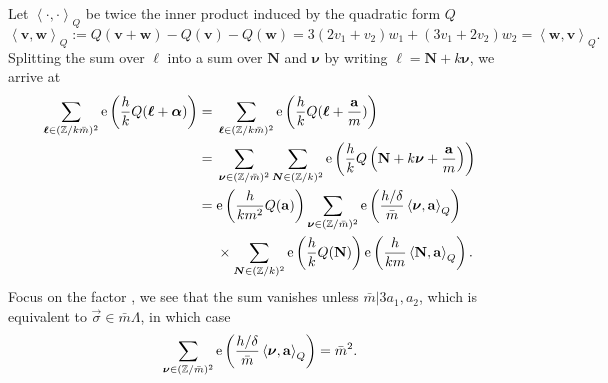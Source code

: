 \documentclass[10pt,a4paper]{amsart}
\newcommand{\ZZ}{\mathbb{Z}}
\def\bal{\boldsymbol{\alpha}}
\def\bol{\boldsymbol{\ell}}
\def\ex{{\rm e}}
\theoremstyle{definition}
\numberwithin{equation}{section}
\begin{document}
Let $\left< \cdot,\cdot \right>_{Q}$ be twice the inner product induced by the quadratic form $Q$
\begin{equation*}%
\left<\mathbf{v},\mathbf{w}\right>_Q:=Q(\mathbf{v}+\mathbf{w})-Q(\mathbf{v})-Q(\mathbf{w})=3\left(2v_1+v_2\right)w_1+\left(3v_1+2v_2\right)w_2=\left<\mathbf{w},\mathbf{v}\right>_Q.
\end{equation*}
Splitting the sum over $\bol$ into a sum over $\mathbf{N}$ and $\boldsymbol{\nu}$ by writing $\bol=\mathbf{N}+k\boldsymbol{\nu}$, we arrive at
\begin{align*}
\sum_{\boldsymbol{\ell}\in (\ZZ/k\bar m)^2 }\ex\left(\frac{h}{k}Q(\bol+\bal)\right) ={}& \sum_{\boldsymbol{\ell}\in (\ZZ/k\bar m)^2 }\ex\left(\frac{h}{k}Q(\bol+\frac{\mathbf{a}}{ m})\right)\\
={}& \sum_{\boldsymbol{\nu}\in (\ZZ/\bar m)^2 } \sum_{\boldsymbol{N}\in (\ZZ/k)^2 }\ex\left(\frac{h}{k}Q\left(\mathbf{N}+k\boldsymbol{\nu}+\frac{\mathbf{a}}{m}\right)\right)\\
={}& \ex\left( \frac{h}{k m^2} Q(\mathbf{a}) \right) \sum_{\boldsymbol{\nu}\in (\ZZ/\bar m)^2 } \ex\left(\frac{h/\delta}{\bar m}\left<\boldsymbol{\nu},\mathbf{a}\right>_Q \right) \\&\times \sum_{\boldsymbol{N}\in (\ZZ/k)^2 } \ex\left(\frac{h}{k}Q(\mathbf{N})\right) \ex\left(\frac{h}{km}\left<\mathbf{N},\mathbf{a}\right>_Q\right) .
\end{align*}
Focus on the factor \smash{$\sum_{\boldsymbol{\nu}\in (\ZZ/\bar m)^2 } \ex\left(\frac{h/\delta}{\bar m}\left<\boldsymbol{\nu},\mathbf{a}\right>_Q \right) $}, we see that the sum vanishes unless $\bar m\lvert 3a_1, a_2$, which is equivalent to $\vec \sigma \in \bar m \Lambda$, in which case
\begin{equation*}
 \sum_{\boldsymbol{\nu}\in (\ZZ/\bar m)^2 } \ex\left(\frac{h/\delta}{\bar m}\left<\boldsymbol{\nu},\mathbf{a}\right>_Q \right)=\bar m^2.
\end{equation*}
\end{document}
